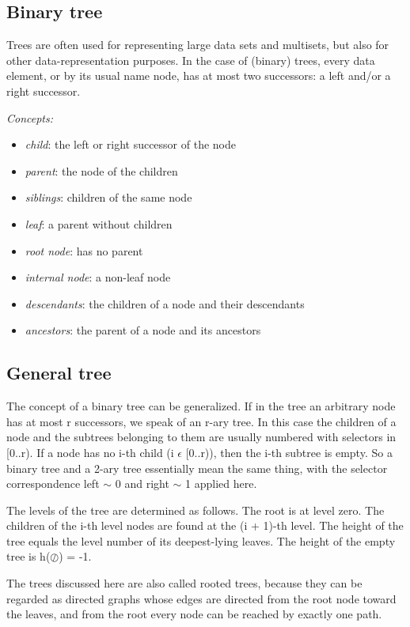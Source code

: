 \documentclass[margin=0px]{article}
\begin{document}
\subsection{Binary tree}

Trees are often used for representing large data sets and multisets,
but also for other data-representation purposes.
In the case of (binary) trees, every data element, or by its usual name node,
has at most two successors: a left and/or a
right successor.

\textit{Concepts:}
\begin{itemize}
    \item \textit{child}: the left or right successor of the node
    \item \textit{parent}: the node of the children
    \item \textit{siblings}: children of the same node
    \item \textit{leaf}: a parent without children
    \item \textit{root node}: has no parent
    \item \textit{internal node}: a non-leaf node
    \item \textit{descendants}: the children of a node and their descendants
    \item \textit{ancestors}: the parent of a node and its ancestors
\end{itemize}

\subsection{General tree}
The concept of a binary tree can be generalized. If in the tree an arbitrary node has at most r successors, we speak of an r-ary tree. In this case the children of a node and the subtrees belonging to them are usually numbered with selectors in [0..r). If a node has no i-th child (i $\epsilon$  [0..r)), then the i-th
subtree is empty. So a binary tree and a 2-ary tree essentially mean the same thing, with
the selector correspondence left $\sim$  0 and right $\sim$ 1 applied here.

The levels of the tree are determined as follows. The root is at level zero. The children of
the i-th level nodes are found at the (i + 1)-th level. The height of the tree equals the level number of its deepest-lying leaves. The height of the empty tree is h($\oslash$) = -1.

The trees discussed here are also called rooted trees, because they can be regarded as directed graphs whose edges are
directed from the root node toward the leaves, and from the root every node can be reached by exactly one path.
\end{document}

